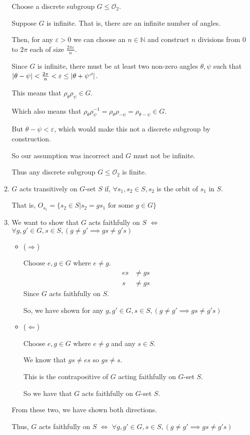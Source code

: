 \documentclass[12pt,letterpaper]{article}
\newcommand{\abs}[1]{\lvert#1\rvert}
\begin{document}
\begin{enumerate}
      Choose a discrete subgroup $G \le \mathcal{O}_2$.

      Suppose $G$ is infinite.
      That is, there are an infinite number of angles.

      Then, for any $\varepsilon > 0$ we can choose an $n \in \mathbb{N}$
      and construct $n$ divisions from 0 to $2\pi$ each of size $\frac{2 \pi \varepsilon}{n}$.

      Since $G$ is infinite, there must be at least two non-zero angles $\theta, \psi$
      such that $\abs{\theta - \psi} < \frac{2 \pi}{n} < \varepsilon \le \abs{\theta + \psi`'}$.

      This means that $\rho_\theta \rho_\psi \in G$.

      Which also means that $\rho_\theta \rho_\psi^{-1} = \rho_\theta \rho_{-\psi} = \rho_{\theta - \psi} \in G$.

      But $\theta - \psi < \varepsilon$, which would make this not a discrete subgroup by construction.

      So our assumption was incorrect and $G$ must not be infinite.

      Thus any discrete subgroup $G \le \mathcal{O}_2$ is finite.

    \item
      $G$ acts transitively on $G$-set $S$ if,
      $\forall s_1, s_2 \in S, s_2$ is the orbit of $s_1$ in $S$.

      That is, $O_{s_1} = \{s_2 \in S | s_2 = g s_1 \text{ for some } g \in G\}$

    \item
      We want to show that $G$ acts faithfully on $S$ $\iff$
      $\forall g, g' \in G, s \in S, (g \ne g' \implies g s \ne g' s)$
      \begin{itemize}
        \item ($\Longrightarrow$)

          Choose $e, g \in G$ where $e \ne g$.
          \begin{align*}
            e s &\ne g s \\
            s &\ne g s
          \end{align*}
          Since $G$ acts faithfully on $S$.

          So, we have shown for any $g, g' \in G, s \in S, (g \ne g' \implies g s \ne g' s)$

        \item ($\Longleftarrow$)

          Choose $e, g \in G$ where $e \ne g$ and any $s \in S$.

          We know that $g s \ne e s$ so $g s \ne s$.

          This is the contrapositive of $G$ acting faithfully on $G$-set $S$.

          So we have that $G$ acts faithfully on $G$-set $S$.
      \end{itemize}

      From these two, we have shown both directions.

      Thus, $G$ acts faithfully on $S$ $\iff$
      $\forall g, g' \in G, s \in S, (g \ne g' \implies g s \ne g' s)$
  \end{enumerate}
\end{document}
